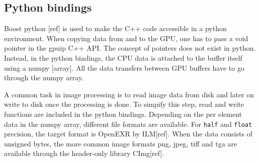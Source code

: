 \subsection{Python bindings}

Boost python [ref] is used to make the C++ code accessible in a python environment. When copying data from and to the GPU, one has to pass a void pointer in the gpuip C++ API. The concept of pointers does not exist in python. Instead, in the python bindings, the CPU data is attached to the buffer itself using a numpy [array]. All the data transfers between GPU buffers have to go through the numpy array.
\newline

A common task in image processing is to read image data from disk and later on write to disk once the processing is done. To simpify this step, read and write functions are included in the python bindings. Depending on the per element data in the numpy array, different file formats are available. For {\tt half} and {\tt float} precision, the target format is OpenEXR by ILM[ref]. When the data consists of unsigned bytes, the more common image formats png, jpeg, tiff and tga are available through the header-only library CImg[ref].  

